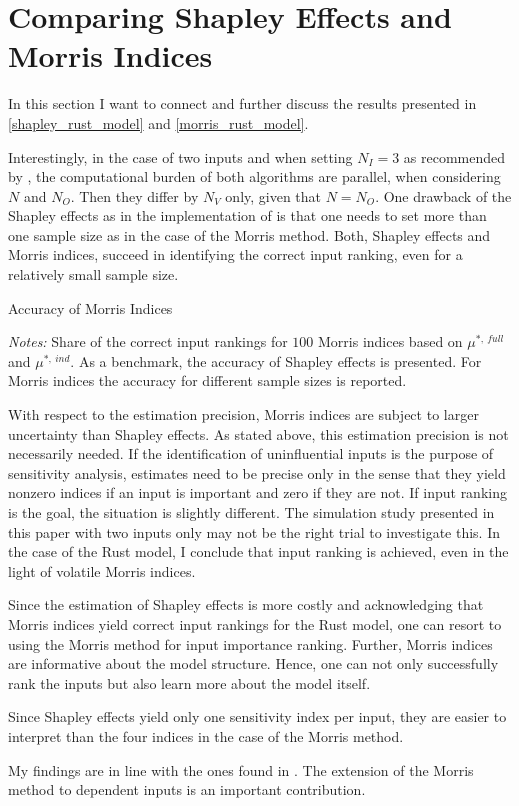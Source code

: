 \section{Comparing Shapley Effects and Morris Indices} \label{comparison}

In this section I want to connect and further discuss the results presented in \cref{shapley_rust_model}
and \cref{morris_rust_model}.

Interestingly, in the case of two inputs and when setting $N_I = 3$ as recommended
by \citet{SNS16}, the computational burden of both algorithms are parallel, when
considering $N$ and $N_O$. Then they differ by $N_V$ only, given that $N = N_O$. One drawback
of the Shapley effects as in the implementation of \citet{SNS16} is that one needs to
set more than one sample size as in the case of the Morris method.
Both, Shapley effects and Morris indices, succeed in identifying the correct input
ranking, even for a relatively small sample size.

\begin{table}
	\centering
	\caption{Accuracy of Morris Indices}
	\label{accuracy}
	\begin{threeparttable}
	\centering
	
	\begin{tablenotes}
	\small
	\item \textit{Notes:} Share of the correct input rankings for $100$ Morris indices based on $\mu^{\ast,\ full}$ and $\mu^{\ast,\ ind}$. As a benchmark, the accuracy of Shapley effects is presented. For Morris indices the accuracy for different sample sizes is reported.
	\end{tablenotes}
	\end{threeparttable}
\end{table}

With respect to the estimation precision, Morris indices are subject to larger uncertainty
than Shapley effects. As stated above, this estimation precision is not necessarily needed. If
the identification of uninfluential inputs is the purpose of sensitivity analysis, estimates need to be precise
only in the sense that they yield nonzero indices if an input is important and zero if they
are not. If input ranking is the goal, the situation is slightly different. The simulation
study presented in this paper with two inputs only may not be the right trial to investigate
this. In the case of the Rust model, I conclude that input ranking is achieved, even in the
light of volatile Morris indices.

Since the estimation of Shapley effects is more costly and acknowledging that Morris
indices yield correct input rankings for the Rust model, one can resort to using the Morris
method for input importance ranking. Further, Morris indices are informative about the
model structure. Hence, one can not only successfully rank the inputs but also learn more
about the model itself.

Since Shapley effects yield only one sensitivity index per input, they are easier to interpret than the four indices in the case of the Morris method.

My findings are in line with the ones found in \citet{GM17}. The extension of the Morris method to dependent inputs is an important contribution.